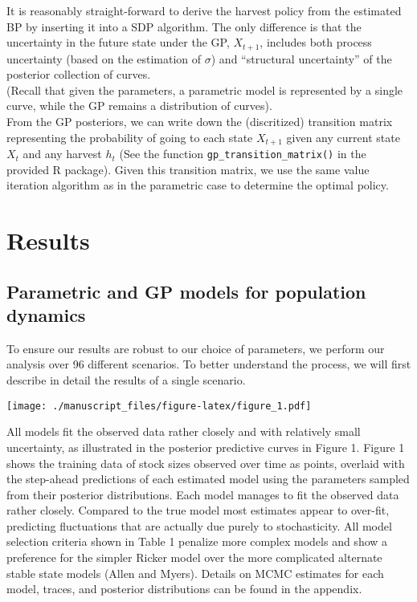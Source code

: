 \documentclass[]{components/elsarticle}
\begin{document}
It is reasonably straight-forward to derive the harvest policy from the
estimated BP by inserting it into a SDP algorithm. The only difference
is that the uncertainty in the future state under the GP, $X_{t+1}$,
includes both process uncertainty (based on the estimation of $\sigma$)
and ``structural uncertainty'' of the posterior collection of
curves.\\(Recall that given the parameters, a parametric model is
represented by a single curve, while the GP remains a distribution of
curves).\\From the GP posteriors, we can write down the (discritized)
transition matrix representing the probability of going to each state
$X_{t+1}$ given any current state $X_t$ and any harvest $h_t$ (See the
function \texttt{gp\_transition\_matrix()} in the provided R package).
Given this transition matrix, we use the same value iteration algorithm
as in the parametric case to determine the optimal policy.

\section{Results}\label{results}

\subsection{Parametric and GP models for population
dynamics}\label{parametric-and-gp-models-for-population-dynamics}

To ensure our results are robust to our choice of parameters, we perform
our analysis over 96 different scenarios. To better understand the
process, we will first describe in detail the results of a single
scenario.

\texttt{[image: ./manuscript\_files/figure-latex/figure\_1.pdf]}

All models fit the observed data rather closely and with relatively
small uncertainty, as illustrated in the posterior predictive curves in
Figure 1. Figure 1 shows the training data of stock sizes observed over
time as points, overlaid with the step-ahead predictions of each
estimated model using the parameters sampled from their posterior
distributions. Each model manages to fit the observed data rather
closely. Compared to the true model most estimates appear to over-fit,
predicting fluctuations that are actually due purely to stochasticity.
All model selection criteria shown in Table 1 penalize more complex
models and show a preference for the simpler Ricker model over the more
complicated alternate stable state models (Allen and Myers). Details on
MCMC estimates for each model, traces, and posterior distributions can
be found in the appendix.
\end{document}
